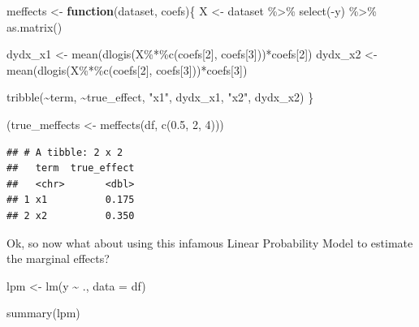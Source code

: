 \documentclass[
]{article}
\newenvironment{Shaded}{\begin{snugshade}}{\end{snugshade}}
\newcommand{\AttributeTok}[1]{\textcolor[rgb]{0.77,0.63,0.00}{#1}}
\newcommand{\ControlFlowTok}[1]{\textcolor[rgb]{0.13,0.29,0.53}{\textbf{#1}}}
\newcommand{\DecValTok}[1]{\textcolor[rgb]{0.00,0.00,0.81}{#1}}
\newcommand{\FloatTok}[1]{\textcolor[rgb]{0.00,0.00,0.81}{#1}}
\newcommand{\FunctionTok}[1]{\textcolor[rgb]{0.00,0.00,0.00}{#1}}
\newcommand{\NormalTok}[1]{#1}
\newcommand{\OtherTok}[1]{\textcolor[rgb]{0.56,0.35,0.01}{#1}}
\newcommand{\SpecialCharTok}[1]{\textcolor[rgb]{0.00,0.00,0.00}{#1}}
\newcommand{\StringTok}[1]{\textcolor[rgb]{0.31,0.60,0.02}{#1}}
\begin{document}
\begin{Shaded}
\begin{Highlighting}[]
\NormalTok{meffects }\OtherTok{\textless{}{-}} \ControlFlowTok{function}\NormalTok{(dataset, coefs)\{}
\NormalTok{  X }\OtherTok{\textless{}{-}}\NormalTok{ dataset }\SpecialCharTok{\%\textgreater{}\%} 
  \FunctionTok{select}\NormalTok{(}\SpecialCharTok{{-}}\NormalTok{y) }\SpecialCharTok{\%\textgreater{}\%} 
  \FunctionTok{as.matrix}\NormalTok{()}
  
\NormalTok{  dydx\_x1 }\OtherTok{\textless{}{-}} \FunctionTok{mean}\NormalTok{(}\FunctionTok{dlogis}\NormalTok{(X}\SpecialCharTok{\%*\%}\FunctionTok{c}\NormalTok{(coefs[}\DecValTok{2}\NormalTok{], coefs[}\DecValTok{3}\NormalTok{]))}\SpecialCharTok{*}\NormalTok{coefs[}\DecValTok{2}\NormalTok{])}
\NormalTok{  dydx\_x2 }\OtherTok{\textless{}{-}} \FunctionTok{mean}\NormalTok{(}\FunctionTok{dlogis}\NormalTok{(X}\SpecialCharTok{\%*\%}\FunctionTok{c}\NormalTok{(coefs[}\DecValTok{2}\NormalTok{], coefs[}\DecValTok{3}\NormalTok{]))}\SpecialCharTok{*}\NormalTok{coefs[}\DecValTok{3}\NormalTok{])}
  
  \FunctionTok{tribble}\NormalTok{(}\SpecialCharTok{\textasciitilde{}}\NormalTok{term, }\SpecialCharTok{\textasciitilde{}}\NormalTok{true\_effect,}
          \StringTok{"x1"}\NormalTok{, dydx\_x1,}
          \StringTok{"x2"}\NormalTok{, dydx\_x2)}
\NormalTok{\}}

\NormalTok{(true\_meffects }\OtherTok{\textless{}{-}} \FunctionTok{meffects}\NormalTok{(df, }\FunctionTok{c}\NormalTok{(}\FloatTok{0.5}\NormalTok{, }\DecValTok{2}\NormalTok{, }\DecValTok{4}\NormalTok{)))}
\end{Highlighting}
\end{Shaded}

\begin{verbatim}
## # A tibble: 2 x 2
##   term  true_effect
##   <chr>       <dbl>
## 1 x1          0.175
## 2 x2          0.350
\end{verbatim}

Ok, so now what about using this infamous Linear Probability Model to estimate the marginal effects?

\begin{Shaded}
\begin{Highlighting}[]
\NormalTok{lpm }\OtherTok{\textless{}{-}} \FunctionTok{lm}\NormalTok{(y }\SpecialCharTok{\textasciitilde{}}\NormalTok{ ., }\AttributeTok{data =}\NormalTok{ df)}

\FunctionTok{summary}\NormalTok{(lpm)}
\end{Highlighting}
\end{Shaded}
\end{document}

